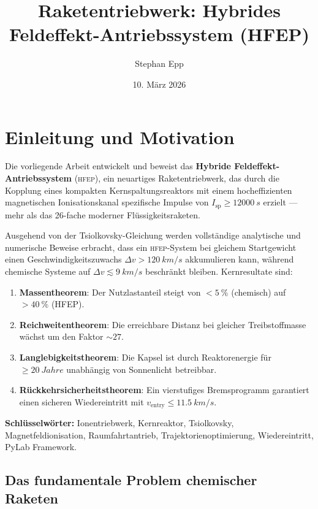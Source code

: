 ﻿\documentclass[a4paper,12pt,twoside]{article}
\title{\textbf{Raketentriebwerk: Hybrides Feldeffekt-Antriebssystem (HFEP)}}
\author{Stephan Epp}
\date{10. März 2026}
\theoremstyle{plain}
\theoremstyle{definition}
\theoremstyle{remark}
\newcommand{\Isp}{I_{\mathrm{sp}}}
\newcommand{\Dv}{\Delta v}
\newcommand{\HFEP}{\textsc{hfep}}
\begin{document}
	
	\maketitle
	
	\tableofcontents
	\newpage
	
	\section{Einleitung und Motivation}
	\label{sec:intro}
	Die vorliegende Arbeit entwickelt und beweist das \textbf{Hybride Feldeffekt-Antriebssystem}
	(\HFEP), ein neuartiges Raketentriebwerk, das durch die Kopplung eines kompakten
	Kernspaltungsreaktors mit einem hocheffizienten magnetischen Ionisationskanal
	spezifische Impulse von $\Isp \geq \SI{12000}{s}$ erzielt --- mehr als das 26-fache
	moderner Flüssigkeitsraketen.
	
	Ausgehend von der Tsiolkovsky-Gleichung werden vollständige analytische und numerische
	Beweise erbracht, dass ein \HFEP-System bei gleichem Startgewicht einen
	Geschwindigkeitszuwachs $\Dv > \SI{120}{km/s}$ akkumulieren kann, während chemische
	Systeme auf $\Dv \lesssim \SI{9}{km/s}$ beschränkt bleiben.
	Kernresultate sind:
	
	\begin{enumerate}
		\item \textbf{Massentheorem}: Der Nutzlastanteil steigt von $<\SI{5}{\%}$
		(chemisch) auf $>\SI{40}{\%}$ (HFEP).
		\item \textbf{Reichweitentheorem}: Die erreichbare Distanz bei gleicher
		Treibstoffmasse wächst um den Faktor $\sim 27$.
		\item \textbf{Langlebigkeitstheorem}: Die Kapsel ist durch Reaktorenergie
		für $\geq \SI{20}{Jahre}$ unabhängig von Sonnenlicht betreibbar.
		\item \textbf{Rückkehrsicherheitstheorem}: Ein vierstufiges
		Bremsprogramm garantiert einen sicheren Wiedereintritt mit
		$v_{\mathrm{entry}} \leq \SI{11.5}{km/s}$.
	\end{enumerate}
	
	\noindent\textbf{Schlüsselwörter:}
	Ionentriebwerk, Kernreaktor, Tsiolkovsky, Magnetfeldionisation, Raumfahrtantrieb,
	Trajektorienoptimierung, Wiedereintritt, PyLab Framework.
	
	\subsection{Das fundamentale Problem chemischer Raketen}
	
\end{document}
